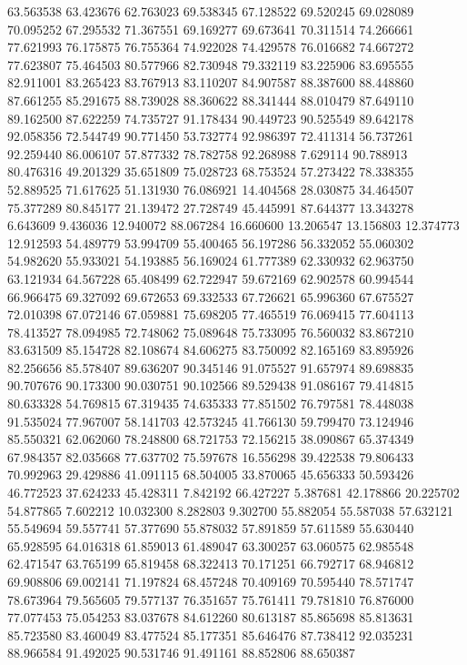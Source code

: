 63.563538
63.423676
62.763023
69.538345
67.128522
69.520245
69.028089
70.095252
67.295532
71.367551
69.169277
69.673641
70.311514
74.266661
77.621993
76.175875
76.755364
74.922028
74.429578
76.016682
74.667272
77.623807
75.464503
80.577966
82.730948
79.332119
83.225906
83.695555
82.911001
83.265423
83.767913
83.110207
84.907587
88.387600
88.448860
87.661255
85.291675
88.739028
88.360622
88.341444
88.010479
87.649110
89.162500
87.622259
74.735727
91.178434
90.449723
90.525549
89.642178
92.058356
72.544749
90.771450
53.732774
92.986397
72.411314
56.737261
92.259440
86.006107
57.877332
78.782758
92.268988
7.629114
90.788913
80.476316
49.201329
35.651809
75.028723
68.753524
57.273422
78.338355
52.889525
71.617625
51.131930
76.086921
14.404568
28.030875
34.464507
75.377289
80.845177
21.139472
27.728749
45.445991
87.644377
13.343278
6.643609
9.436036
12.940072
88.067284
16.660600
13.206547
13.156803
12.374773
12.912593
54.489779
53.994709
55.400465
56.197286
56.332052
55.060302
54.982620
55.933021
54.193885
56.169024
61.777389
62.330932
62.963750
63.121934
64.567228
65.408499
62.722947
59.672169
62.902578
60.994544
66.966475
69.327092
69.672653
69.332533
67.726621
65.996360
67.675527
72.010398
67.072146
67.059881
75.698205
77.465519
76.069415
77.604113
78.413527
78.094985
72.748062
75.089648
75.733095
76.560032
83.867210
83.631509
85.154728
82.108674
84.606275
83.750092
82.165169
83.895926
82.256656
85.578407
89.636207
90.345146
91.075527
91.657974
89.698835
90.707676
90.173300
90.030751
90.102566
89.529438
91.086167
79.414815
80.633328
54.769815
67.319435
74.635333
77.851502
76.797581
78.448038
91.535024
77.967007
58.141703
42.573245
41.766130
59.799470
73.124946
85.550321
62.062060
78.248800
68.721753
72.156215
38.090867
65.374349
67.984357
82.035668
77.637702
75.597678
16.556298
39.422538
79.806433
70.992963
29.429886
41.091115
68.504005
33.870065
45.656333
50.593426
46.772523
37.624233
45.428311
7.842192
66.427227
5.387681
42.178866
20.225702
54.877865
7.602212
10.032300
8.282803
9.302700
55.882054
55.587038
57.632121
55.549694
59.557741
57.377690
55.878032
57.891859
57.611589
55.630440
65.928595
64.016318
61.859013
61.489047
63.300257
63.060575
62.985548
62.471547
63.765199
65.819458
68.322413
70.171251
66.792717
68.946812
69.908806
69.002141
71.197824
68.457248
70.409169
70.595440
78.571747
78.673964
79.565605
79.577137
76.351657
75.761411
79.781810
76.876000
77.077453
75.054253
83.037678
84.612260
80.613187
85.865698
85.813631
85.723580
83.460049
83.477524
85.177351
85.646476
87.738412
92.035231
88.966584
91.492025
90.531746
91.491161
88.852806
88.650387

